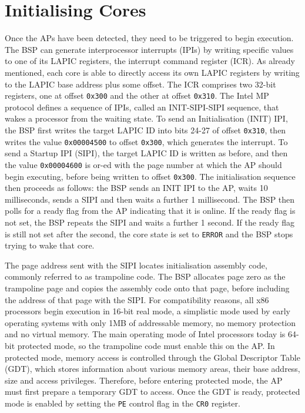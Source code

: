 \documentclass[bsc,frontabs,singlespacing,parskip,deptreport]{infthesis}
\begin{document}
\section{Initialising Cores} \label{initialising-cores}
Once the APs have been detected, they need to be triggered to begin execution. The BSP can generate interprocessor interrupts (IPIs) by writing specific values to one of its LAPIC registers, the interrupt command register (ICR). As already mentioned, each core is able to directly access its own LAPIC registers by writing to the LAPIC base address plus some offset. The ICR comprises two 32-bit registers, one at offset \verb|0x300| and the other at offset \verb|0x310|. The Intel MP protocol defines a sequence of IPIs, called an INIT-SIPI-SIPI sequence, that wakes a processor from the waiting state. To send an Initialisation (INIT) IPI, the BSP first writes the target LAPIC ID into bits 24-27 of offset \verb|0x310|, then writes the value \verb|0x00004500| to offset \verb|0x300|, which generates the interrupt. To send a Startup IPI (SIPI), the target LAPIC ID is written as before, and then the value \verb|0x00004600| is or-ed with the page number at which the AP should begin executing, before being written to offset \verb|0x300|. The initialisation sequence then proceeds as follows: the BSP sends an INIT IPI to the AP, waits 10 milliseconds, sends a SIPI and then waits a further 1 millisecond. The BSP then polls for a ready flag from the AP indicating that it is online. If the ready flag is not set, the BSP repeats the SIPI and waits a further 1 second. If the ready flag is still not set after the second, the core state is set to \verb|ERROR| and the BSP stops trying to wake that core.

The page address sent with the SIPI locates initialisation assembly code, commonly referred to as trampoline code. The BSP allocates page zero as the trampoline page and copies the assembly code onto that page, before including the address of that page with the SIPI. For compatibility reasons, all x86 processors begin execution in 16-bit real mode, a simplistic mode used by early operating systems with only 1MB of addressable memory, no memory protection and no virtual memory. The main operating mode of Intel processors today is 64-bit protected mode, so the trampoline code must enable this on the AP. In protected mode, memory access is controlled through the Global Descriptor Table (GDT), which stores information about various memory areas, their base address, size and access privileges. Therefore, before entering protected mode, the AP must first prepare a temporary GDT to access. Once the GDT is ready, protected mode is enabled by setting the \verb|PE| control flag in the \verb|CR0| register. 
\end{document}
